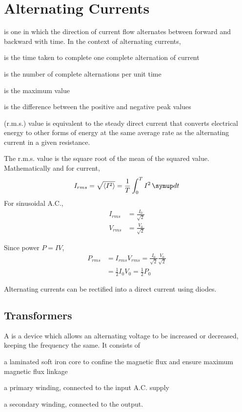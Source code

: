\documentclass[Physics.tex]{subfiles}
\begin{document}
\chapter{Alternating Currents}
 is one in which the direction of current flow alternates between forward and backward with time. In the context of alternating currents, \begin{slinenum}
\item {} is the time taken to complete one complete alternation of current
\item {} is the number of complete alternations per unit time
\item {} is the maximum value
\item {} is the difference between the positive and negative peak values
\item {} (r.m.s.) value is equivalent to the steady direct current that converts electrical energy to other forms of energy at the same average rate as the alternating current in a given resistance.
\end{slinenum}

The r.m.s. value is the square root of the mean of the squared value. Mathematically and for current, \begin{equation}I_{rms} = \sqrt{\langle I^2\rangle} = \frac{1}{T}\int_{0}^{T}I^2\slid t\end{equation} For sinusoidal A.C., \begin{align}I_{rms} &= \frac{I_0}{\sqrt{2}}\\V_{rms} &= \frac{V_0}{\sqrt{2}}\end{align}

Since power \(P = IV\), \begin{equation}\begin{split}P_{rms} &= I_{rms}V_{rms} = \frac{I_0}{\sqrt{2}}\frac{V_0}{\sqrt{2}}\\&= \frac{1}{2}I_0V_0 = \frac{1}{2}P_0\end{split}\end{equation}

Alternating currents can be rectified into a direct current using diodes.
\section{Transformers}
A  is a device which allows an alternating voltage to be increased or decreased, keeping the frequency the same. It consists of \begin{slinenum}
\item a laminated soft iron core to confine the magnetic flux and ensure maximum magnetic flux linkage
\item a primary winding, connected to the input A.C. supply
\item a secondary winding, connected to the output.\end{slinenum}
\end{document}
